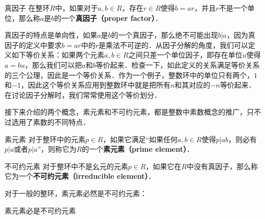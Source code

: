 \begin{definition}{真因子}
在整环$R$中，如果对于$a, b\in R$，存在$r\in R$使得$b=ar$，并且$r$不是一个单位，那么称$a$是$b$的一个\textbf{真因子（proper factor）}．
\end{definition}

真因子的特点是单向性，如果$a$是$b$的一个真因子，那么绝不可能出现$b|a$，因为真因子的定义中要求$b=ar$中的$r$是乘法不可逆的．从因子分解的角度，我们可以定义如下等价关系：如果两个元素$a, b\in R$之间只差一个单位因子，即存在单位$u$使得$a=bu$，那么我们可以把$a$和$b$等价起来．检查一下，如此定义的关系满足等价关系的三个公理，因此是一个等价关系．作为一个例子，整数环中的单位只有两个，$1$和$-1$，因此这个等价关系应用到整数环中就是把所有$n$和其对应的$-n$等价起来．在讨论因子分解时，我们常常使用这个等价划分．

接下来介绍的两个概念，素元素和不可约元素，都是整数中素数概念的推广，只不过选用了素数的不同特点．

\begin{definition}{素元素}
对于整环中的元素$p\in R$，如果它满足“如果任何$a, b\in R$使得$p|ab$，则必有$p|a$或者$p|a$”，则称它为$R$的一个\textbf{素元素（prime element）}．
\end{definition}

\begin{definition}{不可约元素}
对于整环中不是幺元的元素$p\in R$，如果它在$R$中没有真因子，那么称它为一个\textbf{不可约元素（irreducible element）}．
\end{definition}

对于一般的整环，素元素必然是不可约元素：

\begin{theorem}{素元素必是不可约元素}

\end{theorem}



